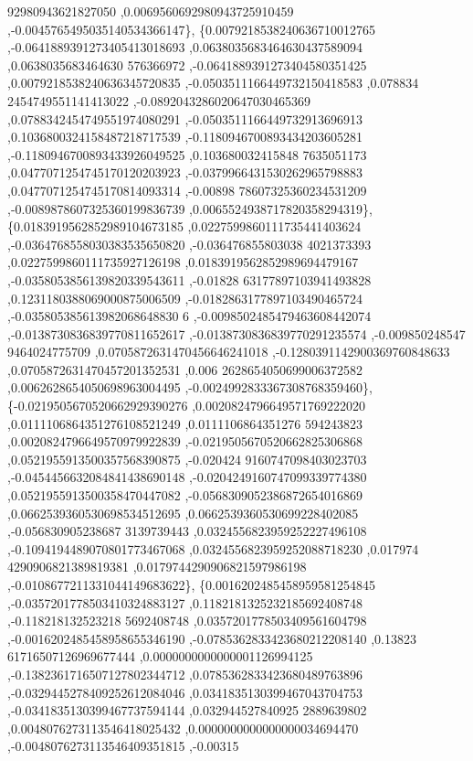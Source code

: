 \begin{DoxyCode}
      92980943621827050 ,0.0069560692980943725910459 ,-0.0045765495035140534366147\},
\{0.0079218538240636710012765 ,-0.0641889391273405413018693 ,0.0638035683464630437589094 ,0.0638035683464630
      576366972 ,-0.0641889391273404580351425 ,0.0079218538240636345720835 ,-0.0503511166449732150418583 ,0.078834
      2454749551141413022 ,-0.0892043286020647030465369 ,0.0788342454749551974080291 ,-0.0503511166449732913696913
       ,0.1036800324158487218717539 ,-0.1180946700893434203605281 ,-0.1180946700893433926049525 ,0.103680032415848
      7635051173 ,0.0477071254745170120203923 ,-0.0379966431530262965798883 ,0.0477071254745170814093314 ,-0.00898
      78607325360234531209 ,-0.0089878607325360199836739 ,0.0065524938717820358294319\},
\{0.0183919562852989104673185 ,0.0227599860111735441403624 ,-0.0364768558030383535650820 ,-0.036476855803038
      4021373393 ,0.0227599860111735927126198 ,0.0183919562852989694479167 ,-0.0358053856139820339543611 ,-0.01828
      63177897103941493828 ,0.1231180388069000875006509 ,-0.0182863177897103490465724 ,-0.035805385613982068648830
      6 ,-0.0098502485479463608442074 ,-0.0138730836839770811652617 ,-0.0138730836839770291235574 ,-0.009850248547
      9464024775709 ,0.0705872631470456646241018 ,-0.1280391142900369760848633 ,0.0705872631470457201352531 ,0.006
      2628654050699006372582 ,0.0062628654050698963004495 ,-0.0024992833367308768359460\},
\{-0.0219505670520662929390276 ,0.0020824796649571769222020 ,0.0111106864351276108521249 ,0.0111106864351276
      594243823 ,0.0020824796649570979922839 ,-0.0219505670520662825306868 ,0.0521955913500357568390875 ,-0.020424
      9160747098403023703 ,-0.0454456632084841438690148 ,-0.0204249160747099339774380 ,0.0521955913500358470447082
       ,-0.0568309052386872654016869 ,0.0662539360530698534512695 ,0.0662539360530699228402085 ,-0.056830905238687
      3139739443 ,0.0324556823959252227496108 ,-0.1094194489070801773467068 ,0.0324556823959252088718230 ,0.017974
      4290906821389819381 ,0.0179744290906821597986198 ,-0.0108677211331044149683622\},
\{0.0016202485458959581254845 ,-0.0357201778503410324883127 ,0.1182181325232185692408748 ,-0.118218132523218
      5692408748 ,0.0357201778503409561604798 ,-0.0016202485458958655346190 ,-0.0785362833423680212208140 ,0.13823
      61716507126969677444 ,0.0000000000000001126994125 ,-0.1382361716507127802344712 ,0.0785362833423680489763896
       ,-0.0329445278409252612084046 ,0.0341835130399467043704753 ,-0.0341835130399467737594144 ,0.032944527840925
      2889639802 ,0.0048076273113546418025432 ,0.0000000000000000034694470 ,-0.0048076273113546409351815 ,-0.00315

\end{DoxyCode}
